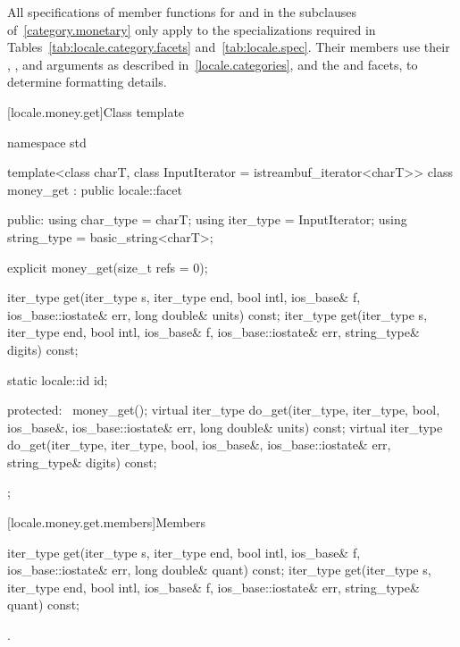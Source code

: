 \pnum
All specifications of member functions
for  and 
in the subclauses of~\ref{category.monetary} only apply to
the specializations required in Tables~\ref{tab:locale.category.facets}
and~\ref{tab:locale.spec}.
Their members use their , ,
and  arguments as described in~\ref{locale.categories}, and
the  and  facets,
to determine formatting details.

[locale.money.get]{Class template }

%
\begin{codeblock}
namespace std {
  template<class charT, class InputIterator = istreambuf_iterator<charT>>
    class money_get : public locale::facet {
    public:
      using char_type   = charT;
      using iter_type   = InputIterator;
      using string_type = basic_string<charT>;

      explicit money_get(size_t refs = 0);

      iter_type get(iter_type s, iter_type end, bool intl,
                    ios_base& f, ios_base::iostate& err,
                    long double& units) const;
      iter_type get(iter_type s, iter_type end, bool intl,
                    ios_base& f, ios_base::iostate& err,
                    string_type& digits) const;

      static locale::id id;

    protected:
      ~money_get();
      virtual iter_type do_get(iter_type, iter_type, bool, ios_base&,
                               ios_base::iostate& err, long double& units) const;
      virtual iter_type do_get(iter_type, iter_type, bool, ios_base&,
                               ios_base::iostate& err, string_type& digits) const;
    };
}
\end{codeblock}

[locale.money.get.members]{Members}

%
\begin{itemdecl}
iter_type get(iter_type s, iter_type end, bool intl, ios_base& f,
              ios_base::iostate& err, long double& quant) const;
iter_type get(iter_type s, iter_type end, bool intl, ios_base& f,
              ios_base::iostate& err, string_type& quant) const;
\end{itemdecl}

\begin{itemdescr}
\pnum
\returns
{}.
\end{itemdescr}

